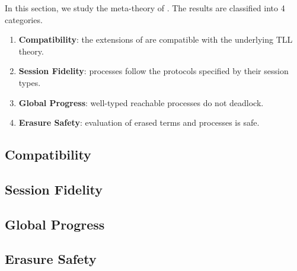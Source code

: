 In this section, we study the meta-theory of \TLLC{}.
The results are classified into 4 categories.
\begin{enumerate}
  \item \textbf{Compatibility}: the extensions of \TLLC{} are compatible with the underlying TLL theory.
  \item \textbf{Session Fidelity}: processes follow the protocols specified by their session types.
  \item \textbf{Global Progress}: well-typed reachable processes do not deadlock.
  \item \textbf{Erasure Safety}: evaluation of erased terms and processes is safe.
\end{enumerate}

\subsection{Compatibility}\label{appendix:compatibility}


\subsection{Session Fidelity}\label{appendix:fidelity}


\subsection{Global Progress}\label{appendix:progress}


\subsection{Erasure Safety}\label{appendix:erasure}
